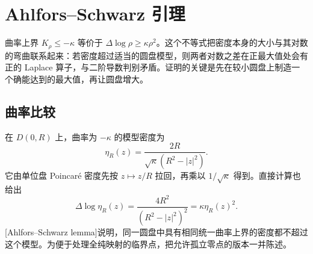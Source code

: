 \section{Ahlfors–Schwarz 引理}
\label{b3:sec:1402}

曲率上界 \(K_\rho\le-\kappa\) 等价于 \(\Delta\log\rho\ge\kappa\rho^2\)。这个不等式把密度本身的大小与其对数的弯曲联系起来：若密度超过适当的圆盘模型，则两者对数之差在正最大值处会有正的 Laplace 算子，与二阶导数判别矛盾。证明的关键是先在较小圆盘上制造一个确能达到的最大值，再让圆盘增大。

\subsection{曲率比较}
\label{b3:subsec:140201}

在 \(D(0,R)\) 上，曲率为 \(-\kappa\) 的模型密度为
\[
 \eta_R(z)=\frac{2R}{\sqrt\kappa(R^2-|z|^2)}.
\]
它由单位盘 Poincaré 密度先按 \(z\mapsto z/R\) 拉回，再乘以 \(1/\sqrt\kappa\) 得到。直接计算也给出
\[
 \Delta\log\eta_R(z)
 =\frac{4R^2}{(R^2-|z|^2)^2}
 =\kappa\eta_R(z)^2.
\]
[Ahlfors--Schwarz lemma]说明，同一圆盘中具有相同统一曲率上界的密度都不超过这个模型。为便于处理全纯映射的临界点，把允许孤立零点的版本一并陈述。

